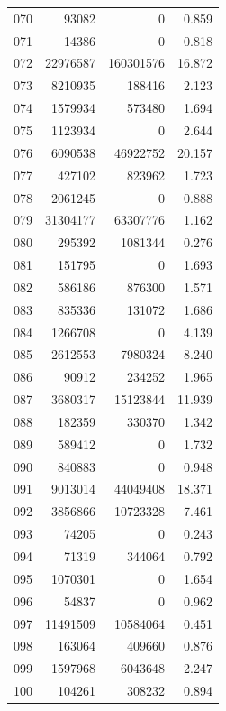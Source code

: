 \documentclass[anonymous,notoc]{gmcm2026}
\begin{document}
\begin{longtable}{lrrr}
070 & 93082 & 0 & 0.859 \\
071 & 14386 & 0 & 0.818 \\
072 & 22976587 & 160301576 & 16.872 \\
073 & 8210935 & 188416 & 2.123 \\
074 & 1579934 & 573480 & 1.694 \\
075 & 1123934 & 0 & 2.644 \\
076 & 6090538 & 46922752 & 20.157 \\
077 & 427102 & 823962 & 1.723 \\
078 & 2061245 & 0 & 0.888 \\
079 & 31304177 & 63307776 & 1.162 \\
080 & 295392 & 1081344 & 0.276 \\
081 & 151795 & 0 & 1.693 \\
082 & 586186 & 876300 & 1.571 \\
083 & 835336 & 131072 & 1.686 \\
084 & 1266708 & 0 & 4.139 \\
085 & 2612553 & 7980324 & 8.240 \\
086 & 90912 & 234252 & 1.965 \\
087 & 3680317 & 15123844 & 11.939 \\
088 & 182359 & 330370 & 1.342 \\
089 & 589412 & 0 & 1.732 \\
090 & 840883 & 0 & 0.948 \\
091 & 9013014 & 44049408 & 18.371 \\
092 & 3856866 & 10723328 & 7.461 \\
093 & 74205 & 0 & 0.243 \\
094 & 71319 & 344064 & 0.792 \\
095 & 1070301 & 0 & 1.654 \\
096 & 54837 & 0 & 0.962 \\
097 & 11491509 & 10584064 & 0.451 \\
098 & 163064 & 409660 & 0.876 \\
099 & 1597968 & 6043648 & 2.247 \\
100 & 104261 & 308232 & 0.894 \\
\end{longtable}
\end{document}
